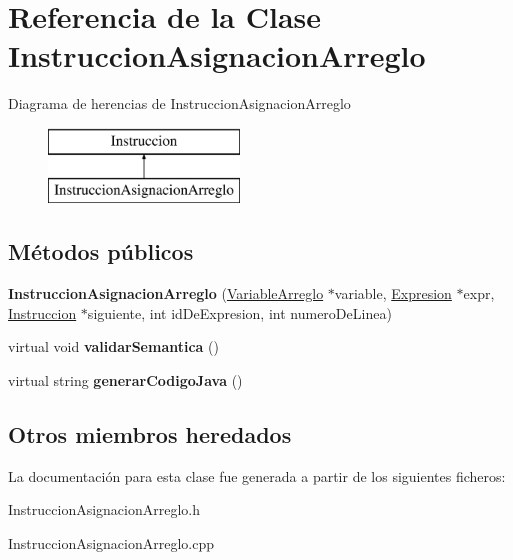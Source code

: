 \hypertarget{class_instruccion_asignacion_arreglo}{\section{Referencia de la Clase Instruccion\-Asignacion\-Arreglo}
\label{class_instruccion_asignacion_arreglo}
}
Diagrama de herencias de Instruccion\-Asignacion\-Arreglo\begin{figure}[H]
\begin{center}
\leavevmode
\includegraphics[height=2.000000cm]{class_instruccion_asignacion_arreglo}
\end{center}
\end{figure}
\subsection*{Métodos públicos}
\begin{DoxyCompactItemize}
\item 
\hypertarget{class_instruccion_asignacion_arreglo_a817cc80d03ef0bcc42c938ea56e13552}{{\bfseries Instruccion\-Asignacion\-Arreglo} (\hyperlink{class_variable_arreglo}{Variable\-Arreglo} $\ast$variable, \hyperlink{class_expresion}{Expresion} $\ast$expr, \hyperlink{class_instruccion}{Instruccion} $\ast$siguiente, int id\-De\-Expresion, int numero\-De\-Linea)}\label{class_instruccion_asignacion_arreglo_a817cc80d03ef0bcc42c938ea56e13552}

\item 
\hypertarget{class_instruccion_asignacion_arreglo_afc00f30c28ac29e2a20785ba0b0602de}{virtual void {\bfseries validar\-Semantica} ()}\label{class_instruccion_asignacion_arreglo_afc00f30c28ac29e2a20785ba0b0602de}

\item 
\hypertarget{class_instruccion_asignacion_arreglo_abb9cd8f5684dc856b7539c08cb190113}{virtual string {\bfseries generar\-Codigo\-Java} ()}\label{class_instruccion_asignacion_arreglo_abb9cd8f5684dc856b7539c08cb190113}

\end{DoxyCompactItemize}
\subsection*{Otros miembros heredados}


La documentación para esta clase fue generada a partir de los siguientes ficheros\-:\begin{DoxyCompactItemize}
\item 
Instruccion\-Asignacion\-Arreglo.\-h\item 
Instruccion\-Asignacion\-Arreglo.\-cpp\end{DoxyCompactItemize}
